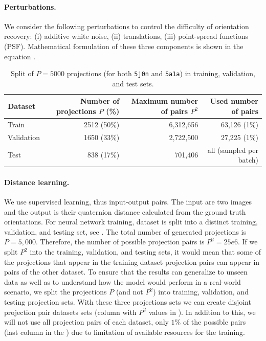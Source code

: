 \paragraph{Perturbations.}
We consider the following perturbations to control the difficulty of orientation recovery: (i) additive white noise, (ii) translations, (iii) point-spread functions (PSF). Mathematical formulation of these three components is shown in the equation .


\begin{table}[ht!]
    \centering
    \begin{tabular}{lrrr}
        \toprule
        Dataset & Number of projections $P$ (\%) & Maximum number of pairs $P^2$ & Used number of pairs \\
        \midrule
        Train & 2512 (50\%) & 6,312,656 & 63,126 (1\%) \\
        Validation & 1650 (33\%) & 2,722,500 & 27,225 (1\%) \\
        Test & 838 (17\%) & 701,406 & all (sampled per batch) \\
        \bottomrule
    \end{tabular}
    \caption{
        Split of $P=5000$ projections (for both \texttt{5j0n} and \texttt{5a1a}) in training, validation, and test sets.
    }\label{tab:dataset}
\end{table}

\paragraph{Distance learning.}
We use supervised learning, thus input-output pairs.
The input are two images and the output is their quaternion distance calculated from the ground truth orientations.
For neural network training, dataset is split into a distinct training, validation, and testing set, see .
The total number of generated projections is $P = 5,000$. Therefore, the number of possible projection pairs is $P^2 = 25e6$. If we split $P^2$ into the training, validation, and testing sets, it would mean that some of the projections that appear in the training dataset projection pairs can appear in pairs of the other dataset. To ensure that the results can generalize to unseen data as well as to understand how the model would perform in a real-world scenario, we split the projections $P$ (and not $P^2$) into training, validation, and testing projection sets. With these three projections sets we can create disjoint projection pair datasets sets (column with $P^2$ values in ). In addition to this, we will not use all projection pairs of each dataset, only $1\%$ of the possible pairs (last column in the ) due to limitation of available resources for the training.


